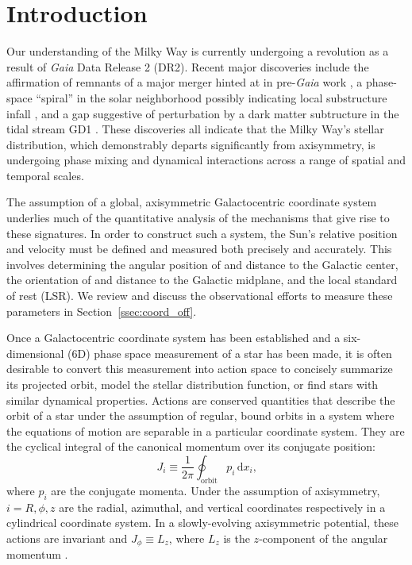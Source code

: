 \documentclass[twocolumn]{aastex62}
\newcommand{\beq}{\begin{equation}}
\newcommand{\eeq}{\end{equation}}
\begin{document}

\section{Introduction} \label{sec:intro} 
Our understanding of the Milky Way is currently undergoing a revolution as a
result of \textit{Gaia} Data Release 2 (DR2). Recent major discoveries include
the affirmation of remnants of a major merger \citep{2018ApJ...860L..11K,
2018MNRAS.478..611B, 2018Natur.563...85H, 2019MNRAS.486..378L,
2019MNRAS.482.3426M} hinted at in pre-\textit{Gaia} work
\citep[e.g.,][]{2005MNRAS.359...93M, 2011MNRAS.412.1203N}, a phase-space
``spiral'' in the solar neighborhood \citep{2018Natur.561..360A} possibly
indicating local substructure infall \citep{2018MNRAS.481.1501B,
2019MNRAS.485.3134L}, and a gap suggestive of perturbation by a dark matter
subtructure in the tidal stream GD1 \citep{2018ApJ...863L..20P,
2018arXiv181103631B}. These discoveries all indicate that the Milky Way's
stellar distribution, which demonstrably departs significantly from
axisymmetry, is undergoing phase mixing and dynamical interactions across a
range of spatial and temporal scales.

The assumption of a global, axisymmetric Galactocentric coordinate system
\citep{2008gady.book.....B} underlies much of the quantitative analysis of the
mechanisms that give rise to these signatures. In order to construct such a
system, the Sun's relative position and velocity must be defined and measured
both precisely and accurately. This involves determining the angular position
of and distance to the Galactic center, the orientation of and distance to the
Galactic midplane, and the local standard of rest (LSR). We review and discuss
the observational efforts to measure these parameters in
Section~\ref{ssec:coord_off}.

Once a Galactocentric coordinate system has been established and a
six-dimensional (6D) phase space measurement of a star has been made, it is
often desirable to convert this measurement into action space to concisely
summarize its projected orbit, model the stellar distribution function, or
find stars with similar dynamical properties. Actions are conserved quantities
that describe the orbit of a star under the assumption of regular, bound
orbits in a system where the equations of motion are separable in a particular
coordinate system. They are the cyclical integral of the canonical momentum
over its conjugate position: 
\beq\label{eq:actions} 
J_i \equiv \frac{1}{2\pi}
\oint_{\text{orbit}}p_i\,\text{d}x_i\text{,} 
\eeq 
where $p_i$ are the conjugate momenta. Under the assumption of axisymmetry,
$i=R,\phi,z$ are the radial, azimuthal, and vertical coordinates respectively
in a cylindrical coordinate system. In a slowly-evolving axisymmetric
potential, these actions are invariant and $J_{\phi} \equiv L_z$, where $L_z$
is the $z$-component of the angular momentum
\citep{2008gady.book.....B,2014RvMP...86....1S}.
\end{document}
